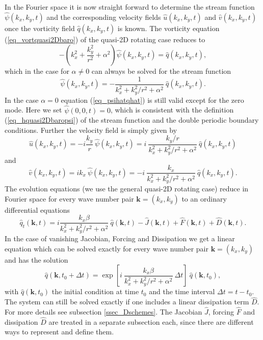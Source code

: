 In the Fourier space it is now straight forward to determine
the stream function $\hat{\psi}(k_{x},k_{y},t)$ and the corresponding
velocity fields $\hat{u}(k_{x},k_{y},t)$ and $\hat{v}(k_{x},k_{y},t)$ once
the vorticity field $\hat{q}(k_{x},k_{y},t)$ is known. The
vorticity equation (\ref{eq_vortquasi2Dbaro}) of the quasi-2D
rotating case reduces to
\begin{equation} \label{eq_fourvortquasi2Dbaro}
 -\left(k_{x}^{2} + \frac{k_{y}^{2}}{r^{2}} + \alpha^{2} \right) 
  \hat{\psi}(k_{x},k_{y},t)
  =
 \hat{q}(k_{x},k_{y},t),
\end{equation}
which in the case for $\alpha \ne 0$ can always be solved for the
stream function
\begin{equation} \label{eq_psihatqhat}
  \hat{\psi}(k_{x},k_{y},t)
  =
  - \frac{1}
  {k_{x}^{2} + k_{y}^{2}/r^{2} + \alpha^{2}} \
  \hat{q}(k_{x},k_{y},t).
\end{equation}
In the case $\alpha = 0$ equation (\ref{eq_psihatqhat}) is still
valid except for the zero mode. Here we set $\hat{\psi}(0,0,t) = 0$,
which is consistent with the definition (\ref{eq_hquasi2Dbaropsi})
of the stream function and the double periodic boundary conditions.
Further the velocity field is simply given by
\begin{equation} \label{eq_uhat}
 \hat{u}(k_{x},k_{y},t) 
  =  -i \frac{k_{y}}{r} \ \hat{\psi}(k_{x},k_{y},t)
  = i \ \frac{k_{y}/r }
  {k_{x}^{2} + k_{y}^{2}/r^{2} + \alpha^{2}} \
  \hat{q}(k_{x},k_{y},t)
\end{equation}
and
\begin{equation} \label{eq_vhat}
 \hat{v}(k_{x},k_{y},t) = i k_{x} \ \hat{\psi}(k_{x},k_{y},t)
  = - i \ \frac{k_{x}}
  {k_{x}^{2} + k_{y}^{2}/r^{2} + \alpha^{2}} \
  \hat{q}(k_{x},k_{y},t).
\end{equation}
The evolution equations (we use the general quasi-2D rotating case)
reduce in Fourier space for every wave number pair
$\mathbf{k} = (k_{x},k_{y})$ to an ordinary differential equations
\begin{equation} \label{eq_evolqhat}
  \hat{q}_{t}(\mathbf{k},t)  
   = 
     i \frac{k_{x} \beta}{k_{x}^{2} + k_{y}^{2}/r^{2} + \alpha^{2}} 
     \ \hat{q}(\mathbf{k},t) 
   - \hat{J}(\mathbf{k},t)  
   + \hat{F}(\mathbf{k},t) 
   + \hat{D}(\mathbf{k},t).
\end{equation}
In the case of vanishing Jacobian, Forcing and Dissipation we get
a linear equation which can be solved exactly for every wave number
pair $\mathbf{k} = (k_{x},k_{y})$  and has the solution
\begin{equation} \label{eq_qhatbetasol}
 \hat{q}(\mathbf{k},t_{0} + \Delta t) 
  = 
 \exp 
  \left[
   i \ \frac{k_{x} \beta}{k_{x}^{2} + k_{y}^{2}/r^{2} + \alpha^{2}} \
   \Delta t 
  \right] 
 \ \hat{q}(\mathbf{k},t_{0}), 
\end{equation}
with $\hat{q}(\mathbf{k},t_{0})$ the initial condition at time $t_{0}$
and the time interval $\Delta t = t - t_{0}$.
The system can still be solved exactly if one includes a linear
dissipation term $\hat{D}$. For more details see subsection
\ref{ssec_Dschemes}. The Jacobian $\hat{J}$, forcing $\hat{F}$
and dissipation $\hat{D}$ are treated in a separate subsection each,
since there are different ways to represent and define them.

